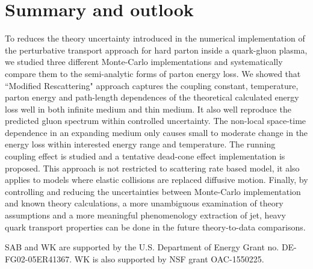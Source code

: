 \documentclass[aps, prc, reprint, amsmath, groupedaddress, nofootinbib]{revtex4-1}
\begin{document}
\section{Summary and outlook}\label{section:summary}
To reduces the theory uncertainty introduced in the numerical implementation of the perturbative transport approach for hard parton inside a quark-gluon plasma, we studied three different Monte-Carlo implementations and systematically compare them to the semi-analytic forms of parton energy loss.
We showed that ``Modified Rescattering" approach captures the coupling constant, temperature, parton energy and path-length dependences of the theoretical calculated energy loss well in both infinite medium and thin medium.
It also well reproduce the predicted gluon spectrum within controlled uncertainty.
The non-local space-time dependence in an expanding medium only causes small to moderate change in the energy loss within interested energy range and temperature.
The running coupling effect is studied and a tentative dead-cone effect implementation is proposed.
This approach is not restricted to scattering rate based model, it also applies to models where elastic collisions are replaced diffusive motion. 
Finally, by controlling and reducing the uncertainties between Monte-Carlo implementation and known theory calculations, a more unambiguous examination of theory assumptions and a more meaningful phenomenology extraction of jet, heavy quark transport properties can be done in the future theory-to-data comparisons.


\begin{acknowledgments}
SAB and WK  are supported by the U.S. Department of Energy Grant no. DE-FG02-05ER41367. WK is also supported by NSF grant OAC-1550225.
\end{acknowledgments}

\begin{appendices}
\end{appendices}
 
\end{document}
